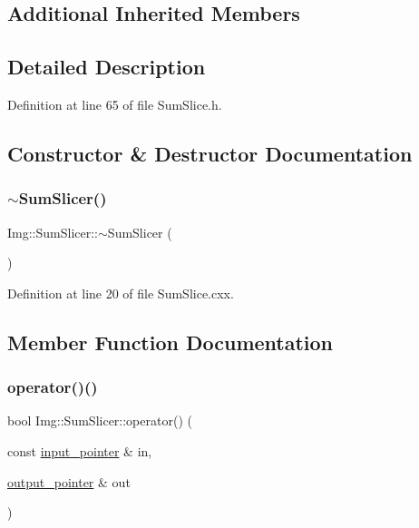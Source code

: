 \subsection*{Additional Inherited Members}


\subsection{Detailed Description}


Definition at line 65 of file Sum\+Slice.\+h.



\subsection{Constructor \& Destructor Documentation}
\mbox{\label{class_wire_cell_1_1_img_1_1_sum_slicer_aa025078967c6b07c07c47c9e9bb597ac}} 
\subsubsection{\texorpdfstring{$\sim$\+Sum\+Slicer()}{~SumSlicer()}}
{\footnotesize\ttfamily Img\+::\+Sum\+Slicer\+::$\sim$\+Sum\+Slicer (\begin{DoxyParamCaption}{ }\end{DoxyParamCaption})\hspace{0.3cm}{\ttfamily [virtual]}}



Definition at line 20 of file Sum\+Slice.\+cxx.



\subsection{Member Function Documentation}
\mbox{\label{class_wire_cell_1_1_img_1_1_sum_slicer_aace8b802844078b3d58f1fcff9c30ebd}} 
\subsubsection{\texorpdfstring{operator()()}{operator()()}}
{\footnotesize\ttfamily bool Img\+::\+Sum\+Slicer\+::operator() (\begin{DoxyParamCaption}\item[{const \hyperlink{class_wire_cell_1_1_i_function_node_a55c0946156df9b712b8ad1a0b59b2db6}{input\+\_\+pointer} \&}]{in,  }\item[{\hyperlink{class_wire_cell_1_1_i_function_node_afc02f1ec60d31aacddf64963f9ca650b}{output\+\_\+pointer} \&}]{out }\end{DoxyParamCaption})}



